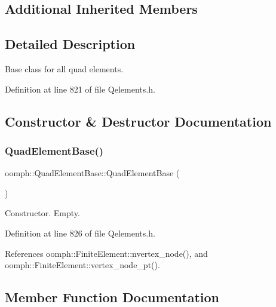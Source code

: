 \subsection*{Additional Inherited Members}


\subsection{Detailed Description}
Base class for all quad elements. 

Definition at line 821 of file Qelements.\+h.



\subsection{Constructor \& Destructor Documentation}
\mbox{\label{classoomph_1_1QuadElementBase_a3b67a4f4ea1a8c5374f3bc4e576cce1c}} 
\subsubsection{\texorpdfstring{Quad\+Element\+Base()}{QuadElementBase()}}
{\footnotesize\ttfamily oomph\+::\+Quad\+Element\+Base\+::\+Quad\+Element\+Base (\begin{DoxyParamCaption}{ }\end{DoxyParamCaption})\hspace{0.3cm}{\ttfamily [inline]}}



Constructor. Empty. 



Definition at line 826 of file Qelements.\+h.



References oomph\+::\+Finite\+Element\+::nvertex\+\_\+node(), and oomph\+::\+Finite\+Element\+::vertex\+\_\+node\+\_\+pt().



\subsection{Member Function Documentation}
\mbox{\label{classoomph_1_1QuadElementBase_a84d28d4fad80333d994d9455596b1ae9}} 
